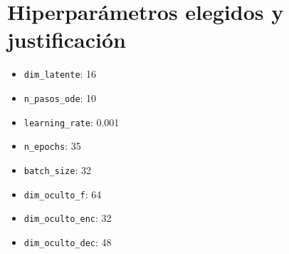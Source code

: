 \documentclass[12pt]{article}
\begin{document}
\section{Hiperparámetros elegidos y justificación}

\begin{itemize}
\item \texttt{dim\_latente}: 16
\item \texttt{n\_pasos\_ode}: 10
\item \texttt{learning\_rate}: 0.001
\item \texttt{n\_epochs}: 35
\item \texttt{batch\_size}: 32
\item \texttt{dim\_oculto\_f}: 64
\item \texttt{dim\_oculto\_enc}: 32
\item \texttt{dim\_oculto\_dec}: 48
\end{itemize}
\end{document}
